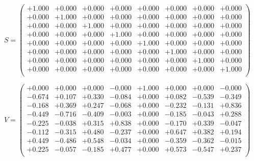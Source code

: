 \documentclass[9pt]{article}
\theoremstyle{plain}
\theoremstyle{definition}
\theoremstyle{remark}
\numberwithin{equation}{section}
\begin{document}
$S = \left(
\begin{array}{
cccccccc}
+1.000 & +0.000 & +0.000 & +0.000 & +0.000 & +0.000 & +0.000 & +0.000 \\
+0.000 & +1.000 & +0.000 & +0.000 & +0.000 & +0.000 & +0.000 & +0.000 \\
+0.000 & +0.000 & +1.000 & +0.000 & +0.000 & +0.000 & +0.000 & +0.000 \\
+0.000 & +0.000 & +0.000 & +1.000 & +0.000 & +0.000 & +0.000 & +0.000 \\
+0.000 & +0.000 & +0.000 & +0.000 & +1.000 & +0.000 & +0.000 & +0.000 \\
+0.000 & +0.000 & +0.000 & +0.000 & +0.000 & +1.000 & +0.000 & +0.000 \\
+0.000 & +0.000 & +0.000 & +0.000 & +0.000 & +0.000 & +1.000 & +0.000 \\
+0.000 & +0.000 & +0.000 & +0.000 & +0.000 & +0.000 & +0.000 & +1.000 \\
\end{array}
\right)$ \newline 

$V = \left(
\begin{array}{
cccccccc}
+0.000 & +0.000 & +0.000 & -0.000 & +1.000 & +0.000 & +0.000 & -0.000 \\
-0.674 & +0.107 & +0.330 & -0.084 & +0.000 & +0.082 & -0.539 & -0.349 \\
-0.168 & +0.369 & +0.247 & -0.068 & +0.000 & -0.232 & -0.131 & +0.836 \\
-0.449 & -0.716 & -0.409 & -0.003 & +0.000 & -0.185 & -0.043 & +0.288 \\
-0.225 & -0.038 & +0.315 & +0.838 & +0.000 & -0.170 & +0.339 & -0.047 \\
-0.112 & -0.315 & +0.480 & -0.237 & +0.000 & +0.647 & +0.382 & +0.194 \\
+0.449 & -0.486 & +0.548 & -0.034 & +0.000 & -0.359 & -0.362 & -0.015 \\
+0.225 & -0.057 & -0.185 & +0.477 & +0.000 & +0.573 & -0.547 & +0.237 \\
\end{array}
\right)$ \newline 
\end{document}
